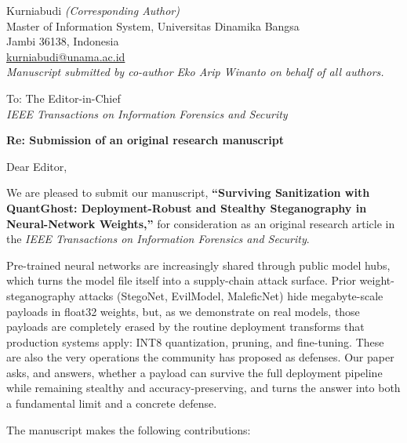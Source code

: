 \documentclass[11pt]{article}
\begin{document}
\noindent Kurniabudi \emph{(Corresponding Author)}\\
Master of Information System, Universitas Dinamika Bangsa\\
Jambi 36138, Indonesia\\
\href{mailto:kurniabudi@unama.ac.id}{kurniabudi@unama.ac.id}\\
\emph{Manuscript submitted by co-author Eko Arip Winanto on behalf of all authors.}

\vspace{1em}
\noindent To: The Editor-in-Chief\\
\noindent \emph{IEEE Transactions on Information Forensics and Security}

\vspace{1em}
\noindent \textbf{Re: Submission of an original research manuscript}

\vspace{0.5em}
\noindent Dear Editor,

We are pleased to submit our manuscript, \textbf{``Surviving Sanitization with
QuantGhost: Deployment-Robust and Stealthy Steganography in Neural-Network Weights,''}
for consideration as an original research article in the \emph{IEEE Transactions on
Information Forensics and Security}.

Pre-trained neural networks are increasingly shared through public model hubs, which
turns the model file itself into a supply-chain attack surface. Prior weight-steganography
attacks (StegoNet, EvilModel, MaleficNet) hide megabyte-scale payloads in float32
weights, but, as we demonstrate on real models, those payloads are completely erased by
the routine deployment transforms that production systems apply: INT8 quantization,
pruning, and fine-tuning. These are also the very operations the community has proposed
as defenses. Our paper asks, and answers, whether a payload can survive the full
deployment pipeline while remaining stealthy and accuracy-preserving, and turns the answer
into both a fundamental limit and a concrete defense.

The manuscript makes the following contributions:
\end{document}
